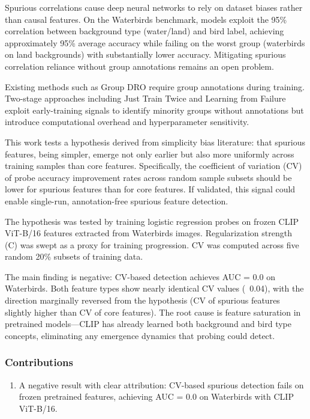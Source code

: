 
Spurious correlations cause deep neural networks to rely on dataset biases rather than causal features. On the Waterbirds benchmark, models exploit the 95\% correlation between background type (water/land) and bird label, achieving approximately 95\% average accuracy while failing on the worst group (waterbirds on land backgrounds) with substantially lower accuracy. Mitigating spurious correlation reliance without group annotations remains an open problem.

Existing methods such as Group DRO \citep{sagawa2020distributionally} require group annotations during training. Two-stage approaches including Just Train Twice \citep{liu2021just} and Learning from Failure \citep{nam2020learning} exploit early-training signals to identify minority groups without annotations but introduce computational overhead and hyperparameter sensitivity.

This work tests a hypothesis derived from simplicity bias literature: that spurious features, being simpler, emerge not only earlier but also more uniformly across training samples than core features. Specifically, the coefficient of variation (CV) of probe accuracy improvement rates across random sample subsets should be lower for spurious features than for core features. If validated, this signal could enable single-run, annotation-free spurious feature detection.

The hypothesis was tested by training logistic regression probes on frozen CLIP ViT-B/16 features extracted from Waterbirds images. Regularization strength (C) was swept as a proxy for training progression. CV was computed across five random 20\% subsets of training data.

The main finding is negative: CV-based detection achieves AUC = 0.0 on Waterbirds. Both feature types show nearly identical CV values (~0.04), with the direction marginally reversed from the hypothesis (CV of spurious features slightly higher than CV of core features). The root cause is feature saturation in pretrained models---CLIP has already learned both background and bird type concepts, eliminating any emergence dynamics that probing could detect.

\subsubsection{Contributions}

\begin{enumerate}
\item A negative result with clear attribution: CV-based spurious detection fails on frozen pretrained features, achieving AUC = 0.0 on Waterbirds with CLIP ViT-B/16.
\end{enumerate}

